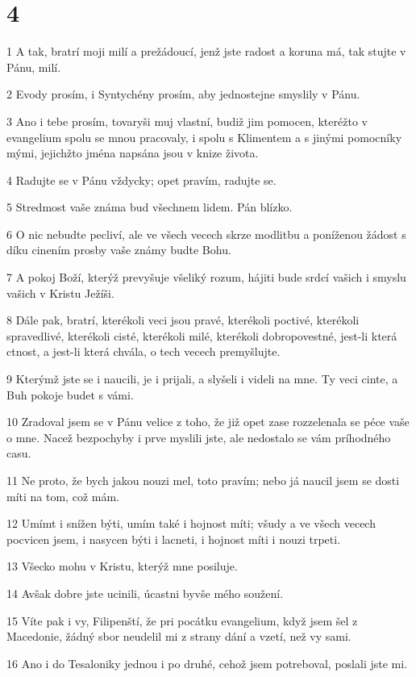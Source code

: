 \chapter{4}

\par 1 A tak, bratrí moji milí a prežádoucí, jenž jste radost a koruna má, tak stujte v Pánu, milí.
\par 2 Evody prosím, i Syntychény prosím, aby jednostejne smyslily v Pánu.
\par 3 Ano i tebe prosím, tovaryši muj vlastní, budiž jim pomocen, kteréžto v evangelium spolu se mnou pracovaly, i spolu s Klimentem a s jinými pomocníky mými, jejichžto jména napsána jsou v knize života.
\par 4 Radujte se v Pánu vždycky; opet pravím, radujte se.
\par 5 Stredmost vaše známa bud všechnem lidem. Pán blízko.
\par 6 O nic nebudte pecliví, ale ve všech vecech skrze modlitbu a poníženou žádost s díku cinením prosby vaše známy budte Bohu.
\par 7 A pokoj Boží, kterýž prevyšuje všeliký rozum, hájiti bude srdcí vašich i smyslu vašich v Kristu Ježíši.
\par 8 Dále pak, bratrí, kterékoli veci jsou pravé, kterékoli poctivé, kterékoli spravedlivé, kterékoli cisté, kterékoli milé, kterékoli dobropovestné, jest-li která ctnost, a jest-li která chvála, o tech vecech premyšlujte.
\par 9 Kterýmž jste se i naucili, je i prijali, a slyšeli i videli na mne. Ty veci cinte, a Buh pokoje budet s vámi.
\par 10 Zradoval jsem se v Pánu velice z toho, že již opet zase rozzelenala se péce vaše o mne. Nacež bezpochyby i prve myslili jste, ale nedostalo se vám príhodného casu.
\par 11 Ne proto, že bych jakou nouzi mel, toto pravím; nebo já naucil jsem se dosti míti na tom, což mám.
\par 12 Umímt i snížen býti, umím také i hojnost míti; všudy a ve všech vecech pocvicen jsem, i nasycen býti i lacneti, i hojnost míti i nouzi trpeti.
\par 13 Všecko mohu v Kristu, kterýž mne posiluje.
\par 14 Avšak dobre jste ucinili, úcastni byvše mého soužení.
\par 15 Víte pak i vy, Filipenští, že pri pocátku evangelium, když jsem šel z Macedonie, žádný sbor neudelil mi z strany dání a vzetí, než vy sami.
\par 16 Ano i do Tesaloniky jednou i po druhé, cehož jsem potreboval, poslali jste mi.
